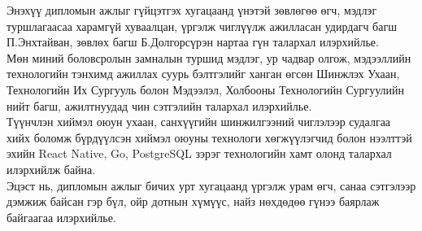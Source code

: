 
\begin{acknowledgements}
\addchaptertocentry{\acknowledgementname}


Энэхүү дипломын ажлыг гүйцэтгэх хугацаанд үнэтэй зөвлөгөө өгч, мэдлэг туршлагаасаа харамгүй хуваалцан, үргэлж чиглүүлж ажилласан удирдагч багш П.Энхтайван, зөвлөх багш Б.Долгорсүрэн нартаа гүн талархал илэрхийлье.\\

Мөн миний боловсролын замналын туршид мэдлэг, ур чадвар олгож, мэдээллийн технологийн тэнхимд ажиллах суурь бэлтгэлийг ханган өгсөн Шинжлэх Ухаан, Технологийн Их Сургууль болон Мэдээлэл, Холбооны Технологийн Сургуулийн нийт багш, ажилтнуудад чин сэтгэлийн талархал илэрхийлье.\\

Түүнчлэн хиймэл оюун ухаан, санхүүгийн шинжилгээний чиглэлээр судалгаа хийх боломж бүрдүүлсэн хиймэл оюуны технологи хөгжүүлэгчид болон нээлттэй эхийн React Native, Go, PostgreSQL зэрэг технологийн хамт олонд талархал илэрхийлж байна.\\

Эцэст нь, дипломын ажлыг бичих урт хугацаанд үргэлж урам өгч, санаа сэтгэлээр дэмжиж байсан гэр бүл, ойр дотнын хүмүүс, найз нөхдөдөө гүнээ баярлаж байгаагаа илэрхийлье.

\end{acknowledgements}
